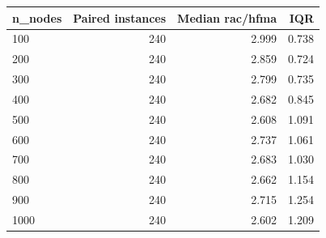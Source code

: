 \begin{tabular}{lrrr}
\toprule
n\_nodes & Paired instances & Median rac/hfma & IQR \\
\midrule
100 & 240 & 2.999 & 0.738 \\
200 & 240 & 2.859 & 0.724 \\
300 & 240 & 2.799 & 0.735 \\
400 & 240 & 2.682 & 0.845 \\
500 & 240 & 2.608 & 1.091 \\
600 & 240 & 2.737 & 1.061 \\
700 & 240 & 2.683 & 1.030 \\
800 & 240 & 2.662 & 1.154 \\
900 & 240 & 2.715 & 1.254 \\
1000 & 240 & 2.602 & 1.209 \\
\bottomrule
\end{tabular}
